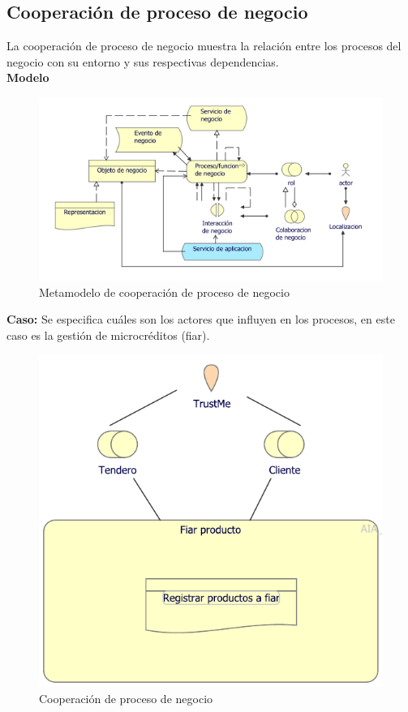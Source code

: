 	\subsection{Cooperación de proceso de negocio}
	{ La cooperación de proceso de negocio muestra la relación entre los procesos del negocio con su entorno y sus respectivas dependencias.\\
		
		\textbf{Modelo}\\
		\begin{figure}[H]
			\centering
			\includegraphics[width=0.8\linewidth]{development/cooperacionproceso.png}
			\caption{Metamodelo de cooperación de proceso de negocio}
		\end{figure}
		
		\textbf{Caso:} Se especifica cuáles son los actores que influyen en los procesos, en este caso es la gestión de microcréditos (fiar).
		
		
		\begin{figure}[H]
			\centering
			\includegraphics[width=0.6\linewidth]{development/cooperacionproceso.pdf}
			\caption{Cooperación de proceso de negocio}
		\end{figure}
	}
	
